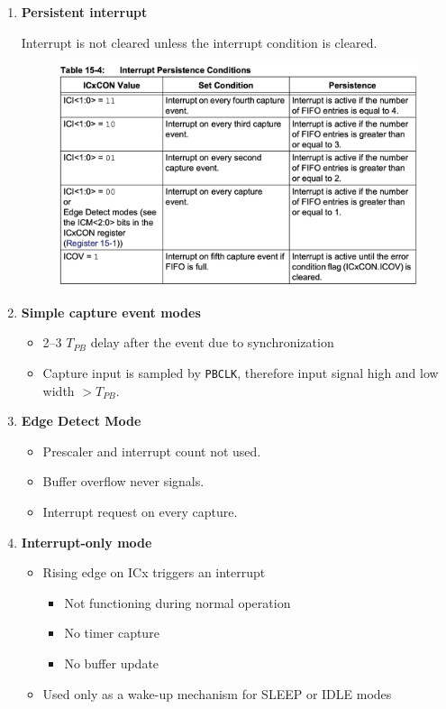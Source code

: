 \documentclass[a4paper]{article}
\begin{document}
\begin{enumerate}[label = \arabic*.]
		\item \textbf{Persistent interrupt}
			\par Interrupt is not cleared unless the interrupt condition is cleared.
			\begin{figure}[H]
				\centering
				\includegraphics[width=0.6\linewidth]{Input_capture_persistent_condition.png}
				\label{fig:Input_capture_persistent_condition.png}
			\end{figure}

		\item \textbf{Simple capture event modes}
			\begin{itemize}[leftmargin = 1cm]
				\item 2--3 \( T_{PB} \) delay after the event due to synchronization
				\item Capture input is sampled by \verb|PBCLK|, therefore input signal high and low width \( >T_{PB} \).
			\end{itemize}

		\item \textbf{Edge Detect Mode}
			\begin{itemize}[leftmargin = 1cm]
				\item Prescaler and interrupt count not used.
				\item Buffer overflow never signals.
				\item Interrupt request on every capture.
			\end{itemize}

		\item \textbf{Interrupt-only mode}
			\begin{itemize}[leftmargin = 1cm]
				\item Rising edge on ICx triggers an interrupt
					\begin{itemize}[leftmargin = 1cm]
						\item Not functioning during normal operation
						\item No timer capture
						\item No buffer update
					\end{itemize}
				\item Used only as a wake-up mechanism for SLEEP or IDLE modes
			\end{itemize}


\end{enumerate}
\end{document}
